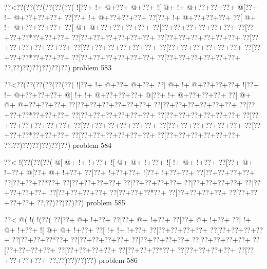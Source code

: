 \vbox{\vbox{\goo
\0??<\0??(\0??(\0??(\0??(\0??(\0??(
\- ![\0??+\- !+\- @+\0??+\- @+\0??+
\- ![\- @+\- !+\- @+\0??+\0??+\0??+
\- @[\0??+\- !+\- @+\0??+\0??+\0??+
\0??[\0??+\- !+\- @+\0??+\0??+\0??+
\0??[\0??+\- !+\- @+\0??+\0??+\0??+
\0??[\- @+\- !+\- @+\0??+\0??+\0??+
\0??[\- @+\- @+\0??+\0??+\0??+\0??+
\0??[\0??+\0??+\0??+\0??+\0??+\0??+
\0??[\0??+\0??+\0??*\0??+\0??+\0??+
\0??[\0??+\0??+\0??+\0??+\0??+\0??+
\0??[\0??+\0??+\0??+\0??+\0??+\0??+
\0??[\0??+\0??+\0??+\0??+\0??+\0??+
\0??[\0??+\0??+\0??+\0??+\0??+\0??+
\0??[\0??+\0??+\0??+\0??+\0??+\0??+
\0??[\0??+\0??+\0??*\0??+\0??+\0??+
\0??[\0??+\0??+\0??+\0??+\0??+\0??+
\0??[\0??+\0??+\0??+\0??+\0??+\0??+
\0??,\0??)\0??)\0??)\0??)\0??)\0??)
}
\hfil problem 583\hfil\break
}

\vbox{\vbox{\goo
\0??<\0??(\0??(\0??(\0??(\0??(\0??(
\- ![\0??+\- !+\- @+\0??+\- @+\0??+
\0??[\- @+\- !+\- @+\0??+\0??+\0??+
\- ![\0??+\- !+\- @+\0??+\0??+\0??+
\- @[\- !+\- !+\- @+\0??+\0??+\0??+
\- @[\0??+\- !+\- @+\0??+\0??+\0??+
\0??[\- @+\- @+\- @+\0??+\0??+\0??+
\0??[\0??+\0??+\0??+\0??+\0??+\0??+
\0??[\0??+\0??+\0??+\0??+\0??+\0??+
\0??[\0??+\0??+\0??*\0??+\0??+\0??+
\0??[\0??+\0??+\0??+\0??+\0??+\0??+
\0??[\0??+\0??+\0??+\0??+\0??+\0??+
\0??[\0??+\0??+\0??+\0??+\0??+\0??+
\0??[\0??+\0??+\0??+\0??+\0??+\0??+
\0??[\0??+\0??+\0??+\0??+\0??+\0??+
\0??[\0??+\0??+\0??*\0??+\0??+\0??+
\0??[\0??+\0??+\0??+\0??+\0??+\0??+
\0??[\0??+\0??+\0??+\0??+\0??+\0??+
\0??,\0??)\0??)\0??)\0??)\0??)\0??)
}
\hfil problem 584\hfil\break
}

\vbox{\vbox{\goo
\0??<\- !(\0??(\0??(\0??(
\- @[\- @+\- !+\- !+\0??+
\- ![\- @+\- @+\- !+\0??+
\- ![\- !+\- @+\- !+\0??+
\0??[\0??+\- @+\- !+\0??+
\- @[\0??+\- @+\- !+\0??+
\0??[\0??+\- !+\0??+\0??+
\- ![\0??+\- !+\0??+\0??+
\0??[\0??+\0??+\0??+\0??+
\0??[\0??+\0??+\0??*\0??+
\0??[\0??+\0??+\0??+\0??+
\0??[\0??+\0??+\0??+\0??+
\0??[\0??+\0??+\0??+\0??+
\0??[\0??+\0??+\0??+\0??+
\0??[\0??+\0??+\0??+\0??+
\0??[\0??+\0??+\0??*\0??+
\0??[\0??+\0??+\0??+\0??+
\0??[\0??+\0??+\0??+\0??+
\0??,\0??)\0??)\0??)\0??)
}
\hfil problem 585\hfil\break
}

\vbox{\vbox{\goo
\0??<\- @(\- !(\- !(\0??(
\0??[\0??+\- @+\- !+\0??+
\0??[\0??+\- @+\- !+\0??+
\0??[\0??+\- @+\- !+\0??+
\0??[\- !+\- @+\- !+\0??+
\- ![\- @+\- @+\- !+\0??+
\0??[\- !+\- !+\- !+\0??+
\0??[\0??+\0??+\0??+\0??+
\0??[\0??+\0??+\0??+\0??+
\0??[\0??+\0??+\0??*\0??+
\0??[\0??+\0??+\0??+\0??+
\0??[\0??+\0??+\0??+\0??+
\0??[\0??+\0??+\0??+\0??+
\0??[\0??+\0??+\0??+\0??+
\0??[\0??+\0??+\0??+\0??+
\0??[\0??+\0??+\0??*\0??+
\0??[\0??+\0??+\0??+\0??+
\0??[\0??+\0??+\0??+\0??+
\0??,\0??)\0??)\0??)\0??)
}
\hfil problem 586\hfil\break
}

